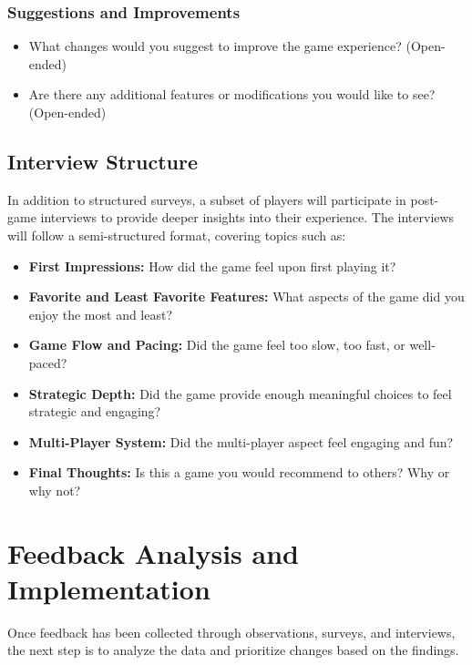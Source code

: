 \documentclass[12pt, titlepage]{article}
\begin{document}
\subsubsection{Suggestions and Improvements}
\begin{itemize}
    \item What changes would you suggest to improve the game experience? (Open-ended)
    \item Are there any additional features or modifications you would like to see? (Open-ended)
\end{itemize}

\subsection{Interview Structure}
In addition to structured surveys, a subset of players will participate in post-game interviews to provide deeper insights into their experience. The interviews will follow a semi-structured format, covering topics such as:

\begin{itemize}
    \item \textbf{First Impressions:} How did the game feel upon first playing it?
    \item \textbf{Favorite and Least Favorite Features:} What aspects of the game did you enjoy the most and least?
    \item \textbf{Game Flow and Pacing:} Did the game feel too slow, too fast, or well-paced?
    \item \textbf{Strategic Depth:} Did the game provide enough meaningful choices to feel strategic and engaging?
    \item \textbf{Multi-Player System:} Did the multi-player aspect feel engaging and fun?
    \item \textbf{Final Thoughts:} Is this a game you would recommend to others? Why or why not?
\end{itemize}

\newpage

\section{Feedback Analysis and Implementation}
Once feedback has been collected through observations, surveys, and interviews, the next step is to analyze the data and prioritize changes based on the findings. 
\end{document}
